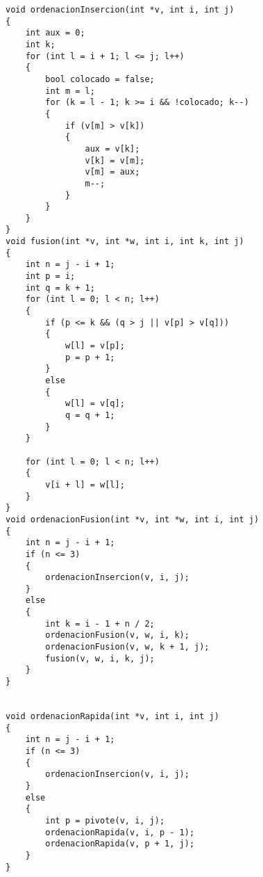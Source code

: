 \begin{lstlisting}
void ordenacionInsercion(int *v, int i, int j)
{
    int aux = 0;
    int k;
    for (int l = i + 1; l <= j; l++)
    {
        bool colocado = false;
        int m = l;
        for (k = l - 1; k >= i && !colocado; k--)
        {
            if (v[m] > v[k])
            {
                aux = v[k];
                v[k] = v[m];
                v[m] = aux;
                m--;
            }
        }
    }
}
void fusion(int *v, int *w, int i, int k, int j)
{
    int n = j - i + 1;
    int p = i;
    int q = k + 1;
    for (int l = 0; l < n; l++)
    {
        if (p <= k && (q > j || v[p] > v[q]))
        {
            w[l] = v[p];
            p = p + 1;
        }
        else
        {
            w[l] = v[q];
            q = q + 1;
        }
    }

    for (int l = 0; l < n; l++)
    {
        v[i + l] = w[l];
    }
}
void ordenacionFusion(int *v, int *w, int i, int j)
{
    int n = j - i + 1;
    if (n <= 3)
    {
        ordenacionInsercion(v, i, j);
    }
    else
    {
        int k = i - 1 + n / 2;
        ordenacionFusion(v, w, i, k);
        ordenacionFusion(v, w, k + 1, j);
        fusion(v, w, i, k, j);
    }
}


void ordenacionRapida(int *v, int i, int j)
{
    int n = j - i + 1;
    if (n <= 3)
    {
        ordenacionInsercion(v, i, j);
    }
    else
    {
        int p = pivote(v, i, j);
        ordenacionRapida(v, i, p - 1);
        ordenacionRapida(v, p + 1, j);
    }
}

\end{lstlisting}